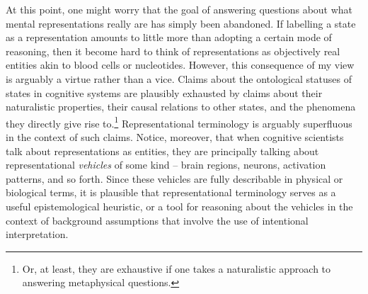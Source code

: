 At this point, one might worry that the goal of answering questions about what mental representations really are has simply been abandoned. If labelling a state as a representation amounts to little more than adopting a certain mode of reasoning, then it become hard to think of representations as objectively real entities akin to blood cells or nucleotides. However, this consequence of my view is arguably a virtue rather than a vice. Claims about the ontological statuses of states in cognitive systems are plausibly exhausted by claims about their naturalistic properties, their causal relations to other states, and the phenomena they directly give rise to.\footnote{Or, at least, they are exhaustive if one takes a naturalistic approach to answering metaphysical questions.} Representational terminology is arguably superfluous in the context of such claims. Notice, moreover, that when cognitive scientists talk about representations as entities, they are principally talking about representational \textit{vehicles} of some kind -- brain regions, neurons, activation patterns, and so forth. Since these vehicles are fully describable in physical or biological terms, it is plausible that representational terminology serves as a useful epistemological heuristic, or a tool for reasoning about the vehicles in the context of background assumptions that involve the use of intentional interpretation. 

